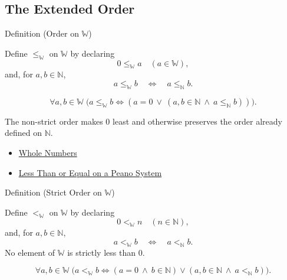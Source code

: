 \subsection*{The Extended Order}

\begin{definitionbox}{Definition (Order on \texorpdfstring{$\mathbb{W}$}{W})}
\begin{definition}
\label{def:order-on-w}
Define $\leq_{\mathbb{W}}$ on $\mathbb{W}$ by declaring
\[
0\leq_{\mathbb{W}}a\quad(a\in\mathbb{W}),
\]
and, for $a,b\in\mathbb{N}$,
\[
a\leq_{\mathbb{W}}b
\quad\Longleftrightarrow\quad
a\leq_{\mathbb{N}}b.
\]
\end{definition}
\end{definitionbox}

\begin{remark*}
\[
\forall a,b\in\mathbb{W}\;
\bigl(a\leq_{\mathbb{W}}b
\Longleftrightarrow
(a=0\ \vee\ (a,b\in\mathbb{N}\ \wedge\ a\leq_{\mathbb{N}}b))\bigr).
\]
\end{remark*}

\begin{remark*}[Interpretation]
The non-strict order makes $0$ least and otherwise preserves the order already
defined on $\mathbb{N}$.
\end{remark*}

\begin{dependencies}
\begin{itemize}
  \item \hyperref[def:whole-numbers]{Whole Numbers}
  \item \hyperref[def:less-than-or-equal-on-peano-system]{Less Than or Equal on a Peano System}
\end{itemize}
\end{dependencies}

\begin{definitionbox}{Definition (Strict Order on \texorpdfstring{$\mathbb{W}$}{W})}
\begin{definition}
\label{def:strict-order-on-w}
Define $<_{\mathbb{W}}$ on $\mathbb{W}$ by declaring
\[
0<_{\mathbb{W}}n\quad(n\in\mathbb{N}),
\]
and, for $a,b\in\mathbb{N}$,
\[
a<_{\mathbb{W}}b
\quad\Longleftrightarrow\quad
a<_{\mathbb{N}}b.
\]
No element of $\mathbb{W}$ is strictly less than $0$.
\end{definition}
\end{definitionbox}

\begin{remark*}
\[
\forall a,b\in\mathbb{W}\;
\bigl(a<_{\mathbb{W}}b
\Longleftrightarrow
(a=0\ \wedge\ b\in\mathbb{N})
\vee
(a,b\in\mathbb{N}\ \wedge\ a<_{\mathbb{N}}b)\bigr).
\]
\end{remark*}

